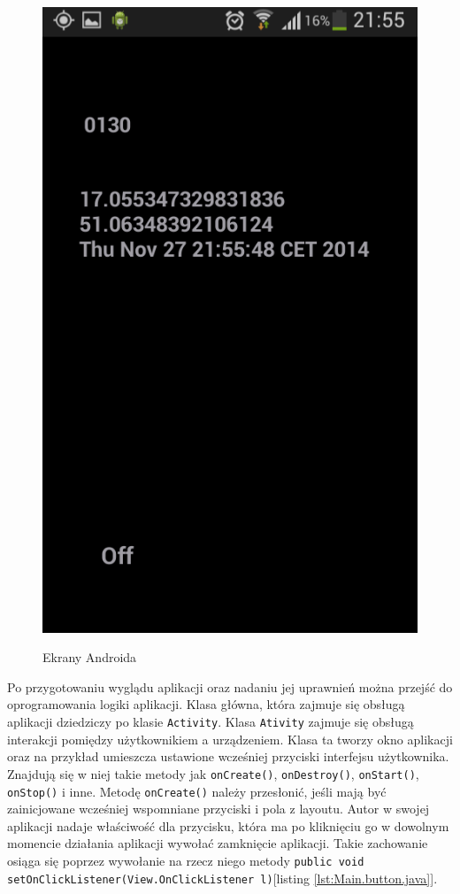 \documentclass[eng,printmode,oneside]{mgr}
\begin{document}
\begin{figure}
{\includegraphics[height=0.33\textheight]{andLokal.png}
}
\caption{Ekrany Androida }
\label{fig:androidViewOK}
\vspace{-10pt}
\end{figure}

Po przygotowaniu wyglądu aplikacji oraz nadaniu jej uprawnień można przejść
do oprogramowania logiki aplikacji. Klasa główna, która zajmuje się obsługą
aplikacji dziedziczy po klasie \texttt{Activity}. Klasa \texttt{Ativity} zajmuje
się obsługą interakcji pomiędzy użytkownikiem a urządzeniem. Klasa ta tworzy okno aplikacji
oraz na przykład umieszcza ustawione wcześniej przyciski interfejsu użytkownika.
Znajdują się w niej takie metody jak \texttt{onCreate()}, \texttt{onDestroy()},
\texttt{onStart()}, \texttt{onStop()} i inne. Metodę \texttt{onCreate()} należy
przesłonić, jeśli mają być zainicjowane wcześniej wspomniane przyciski i pola z layoutu. Autor w swojej aplikacji nadaje
właściwość dla przycisku, która ma po kliknięciu go w dowolnym momencie
działania aplikacji wywołać zamknięcie aplikacji. Takie zachowanie osiąga się
poprzez wywołanie na rzecz niego metody \texttt{public void
setOnClickListener(View.OnClickListener l)}[listing \ref{lst:Main.button.java}].
\end{document}
